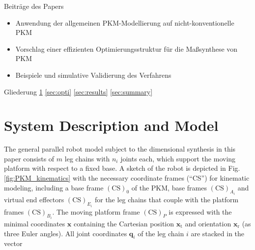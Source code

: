 \documentclass[fleqn,a4paper,10pt]{article}
\newcommand{\bm}[1]{\mathbf{#1}}
\renewcommand{\Phi}[1]{\varPhi{#1}}
\newcommand{\ks}[1]{{(\mathrm{CS})}_{#1}}
\renewenvironment{figure}
  {\par\vspace{6pt}\noindent\minipage{\linewidth}}
  {\endminipage\par\vspace{6pt}}
\begin{document}
\begin{multicols}{2}
Beiträge des Papers
\begin{itemize}
\item Anwendung der allgemeinen PKM-Modellierung auf nicht-konventionelle PKM
\item Vorschlag einer effizienten Optimierungsstruktur für die Maßsynthese von PKM
\item Beispiele und simulative Validierung des Verfahrens
\end{itemize}

Gliederung
\ref{sec:sysmdl}
\ref{sec:opti}
\ref{sec:results}
\ref{sec:summary}

\section{System Description and Model}
\label{sec:sysmdl}


\begin{figure}
\graphicspath{{./Bilder/}}
\centering

\label{fig:PKM_kinematics}
\end{figure}



The general parallel robot model subject to the dimensional synthesis in this paper consists of $m$ leg chains with $n_i$ joints each, which support the moving platform with respect to a fixed base.
A sketch of the robot is depicted in Fig.\,\ref{fig:PKM_kinematics} with the necessary coordinate frames (``CS'') for kinematic modeling, including a base frame $\ks{0}$ of the PKM, base frames $\ks{A_i}$ and virtual end effectors $\ks{E_i}$ for the leg chains  that couple with the platform frames $\ks{B_i}$.
The moving platform frame $\ks{P}$ is expressed with the minimal coordinates $\bm{x}$ containing the Cartesian position $\bm{x}_\mathrm{t}$ and orientation  $\bm{x}_\mathrm{r}$ (as three Euler angles).
All joint coordinates $\bm{q}_i$ of the leg chain $i$ are stacked in the vector


\end{multicols}
\end{document}
